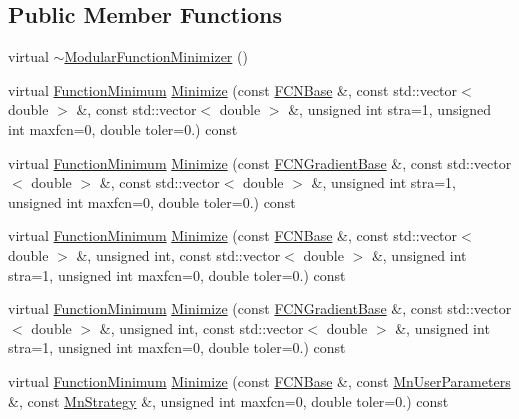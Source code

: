 \subsection*{Public Member Functions}
\begin{DoxyCompactItemize}
\item 
virtual \mbox{\hyperlink{classROOT_1_1Minuit2_1_1ModularFunctionMinimizer_ae8442b0de1a033c86c7b5167f66e0eed}{$\sim$\+Modular\+Function\+Minimizer}} ()
\item 
virtual \mbox{\hyperlink{classROOT_1_1Minuit2_1_1FunctionMinimum}{Function\+Minimum}} \mbox{\hyperlink{classROOT_1_1Minuit2_1_1ModularFunctionMinimizer_a8cbcb596782a34f43e4ce1c48865d0b7}{Minimize}} (const \mbox{\hyperlink{classROOT_1_1Minuit2_1_1FCNBase}{F\+C\+N\+Base}} \&, const std\+::vector$<$ double $>$ \&, const std\+::vector$<$ double $>$ \&, unsigned int stra=1, unsigned int maxfcn=0, double toler=0.) const
\item 
virtual \mbox{\hyperlink{classROOT_1_1Minuit2_1_1FunctionMinimum}{Function\+Minimum}} \mbox{\hyperlink{classROOT_1_1Minuit2_1_1ModularFunctionMinimizer_a8a71d388729f9e81c3c031a2962f4d99}{Minimize}} (const \mbox{\hyperlink{classROOT_1_1Minuit2_1_1FCNGradientBase}{F\+C\+N\+Gradient\+Base}} \&, const std\+::vector$<$ double $>$ \&, const std\+::vector$<$ double $>$ \&, unsigned int stra=1, unsigned int maxfcn=0, double toler=0.) const
\item 
virtual \mbox{\hyperlink{classROOT_1_1Minuit2_1_1FunctionMinimum}{Function\+Minimum}} \mbox{\hyperlink{classROOT_1_1Minuit2_1_1ModularFunctionMinimizer_a83b8641b6e3662f763c79c3fcb014838}{Minimize}} (const \mbox{\hyperlink{classROOT_1_1Minuit2_1_1FCNBase}{F\+C\+N\+Base}} \&, const std\+::vector$<$ double $>$ \&, unsigned int, const std\+::vector$<$ double $>$ \&, unsigned int stra=1, unsigned int maxfcn=0, double toler=0.) const
\item 
virtual \mbox{\hyperlink{classROOT_1_1Minuit2_1_1FunctionMinimum}{Function\+Minimum}} \mbox{\hyperlink{classROOT_1_1Minuit2_1_1ModularFunctionMinimizer_a1cab3c0cc40932cb9287232fe9cf7437}{Minimize}} (const \mbox{\hyperlink{classROOT_1_1Minuit2_1_1FCNGradientBase}{F\+C\+N\+Gradient\+Base}} \&, const std\+::vector$<$ double $>$ \&, unsigned int, const std\+::vector$<$ double $>$ \&, unsigned int stra=1, unsigned int maxfcn=0, double toler=0.) const
\item 
virtual \mbox{\hyperlink{classROOT_1_1Minuit2_1_1FunctionMinimum}{Function\+Minimum}} \mbox{\hyperlink{classROOT_1_1Minuit2_1_1ModularFunctionMinimizer_a93dcf0b210bf0f3ffba5b7b1099751e6}{Minimize}} (const \mbox{\hyperlink{classROOT_1_1Minuit2_1_1FCNBase}{F\+C\+N\+Base}} \&, const \mbox{\hyperlink{classROOT_1_1Minuit2_1_1MnUserParameters}{Mn\+User\+Parameters}} \&, const \mbox{\hyperlink{classROOT_1_1Minuit2_1_1MnStrategy}{Mn\+Strategy}} \&, unsigned int maxfcn=0, double toler=0.) const

\end{DoxyCompactItemize}
